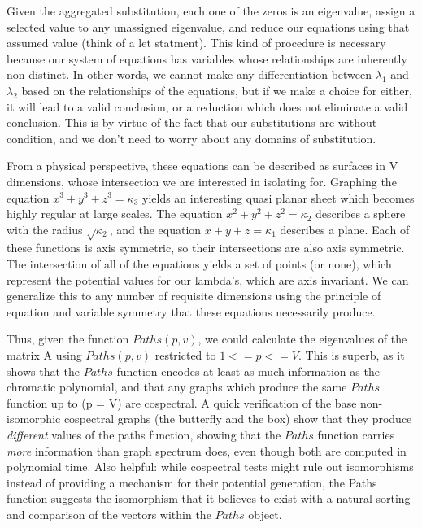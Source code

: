 Given the aggregated substitution, each one of the zeros is an eigenvalue, assign a selected value to any unassigned eigenvalue, and reduce our equations using that assumed value (think of a let statment).
This kind of procedure is necessary because our system of equations has variables whose relationships are inherently non-distinct.
In other words, we cannot make any differentiation between $\lambda_1$ and $\lambda_2$ based on the relationships of the equations, but if we make a choice for either, it will lead to a valid conclusion, or a reduction which does not eliminate a valid conclusion.
This is by virtue of the fact that our substitutions are without condition, and we don't need to worry about any domains of substitution.

From a physical perspective, these equations can be described as surfaces in V dimensions, whose intersection we are interested in isolating for. 
Graphing the equation $x^3 + y^3 + z^3 = \kappa_3$ yields an interesting quasi planar sheet which becomes highly regular at large scales.  
The equation $x^2 + y^2 + z^2 = \kappa_2$ describes a sphere with the radius $\sqrt{\kappa_2}$, and the equation $x + y + z = \kappa_1$ describes a plane. 
Each of these functions is axis symmetric, so their intersections are also axis symmetric.  
The intersection of all of the equations yields a set of points (or none), which represent the potential values for our lambda's, which are axis invariant. 
We can generalize this to any number of requisite dimensions using the principle of equation and variable symmetry that these equations necessarily produce.

Thus, given the function $Paths(p, v)$, we could calculate the eigenvalues of the matrix A using $Paths(p, v)$ restricted to $1 <= p <= V$. 
This is superb, as it shows that the $Paths$ function encodes at least as much information as the chromatic polynomial, and that any graphs which produce the same $Paths$ function up to (p = V) are cospectral. 
A quick verification of the base non-isomorphic cospectral graphs (the butterfly and the box) show that they produce \emph{different} values of the paths function, showing that the $Paths$ function carries \emph{more} information than graph spectrum does, even though both are computed in polynomial time. 
Also helpful: while cospectral tests might rule out isomorphisms instead of providing a mechanism for their potential generation, the Paths function suggests the isomorphism that it believes to exist with a natural sorting and comparison of the vectors within the $Paths$ object.

